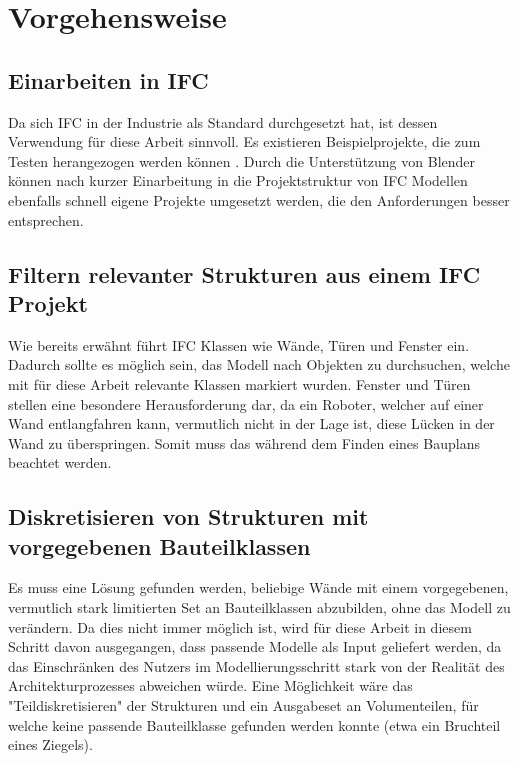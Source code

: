 \section{Vorgehensweise}


\subsection{Einarbeiten in IFC}
Da sich IFC in der Industrie als Standard durchgesetzt hat, ist dessen Verwendung für diese Arbeit sinnvoll.
Es existieren Beispielprojekte, die zum Testen herangezogen werden können \cite{Examples1:online}.
Durch die Unterstützung von Blender können nach kurzer Einarbeitung in die Projektstruktur von IFC Modellen ebenfalls schnell eigene Projekte umgesetzt werden, die den Anforderungen besser entsprechen.

\subsection{Filtern relevanter Strukturen aus einem IFC Projekt}
Wie bereits erwähnt führt IFC Klassen wie Wände, Türen und Fenster ein. 
Dadurch sollte es möglich sein, das Modell nach Objekten zu durchsuchen, welche mit für diese Arbeit relevante Klassen markiert wurden.
Fenster und Türen stellen eine besondere Herausforderung dar, da ein Roboter, welcher auf einer Wand entlangfahren kann, vermutlich nicht in der Lage ist, diese Lücken in der Wand zu überspringen.
Somit muss das während dem Finden eines Bauplans beachtet werden.

\subsection{Diskretisieren von Strukturen mit vorgegebenen Bauteilklassen}
Es muss eine Lösung gefunden werden, beliebige Wände mit einem vorgegebenen, vermutlich stark limitierten Set an Bauteilklassen abzubilden, ohne das Modell zu verändern.
Da dies nicht immer möglich ist, wird für diese Arbeit in diesem Schritt davon ausgegangen, dass passende Modelle als Input geliefert werden, da das Einschränken des Nutzers im Modellierungsschritt stark von der Realität des Architekturprozesses abweichen würde.
Eine Möglichkeit wäre das "Teildiskretisieren" der Strukturen und ein Ausgabeset an Volumenteilen, für welche keine passende Bauteilklasse gefunden werden konnte (etwa ein Bruchteil eines Ziegels).

